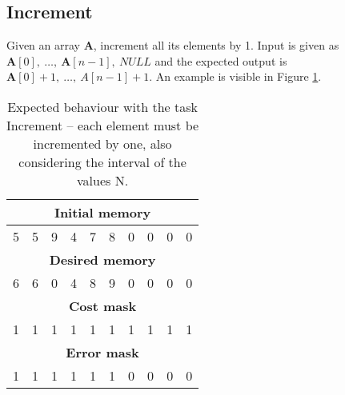 \subsection{Increment}
Given an array $\textbf{A}$, increment all its elements by 1. Input is given as $\textbf{A}[0],\ \dots,\ \textbf{A}[n-1],\ \textit{NULL}$ and the expected output is $\textbf{A}[0] + 1,\ \dots,\ A[n-1] + 1$. An example is visible in Figure \ref{fig:increment-example}.
\begin{table}[h!]
	\centering
	\begin{tabular}{|c|c|c|c|c|c|c|c|c|c|}
		\hline
		\multicolumn{10}{|c|}{\textbf{Initial memory}} \\ \hline
		5 & 5 & 9 & 4 & 7 & 8 & 0 & 0 & 0 & 0 \\ \hline\hline\hline
		\multicolumn{10}{|c|}{\textbf{Desired memory}} \\ \hline
		6 & 6 & 0 & 4 & 8 & 9 & 0 & 0 & 0 & 0 \\ \hline\hline\hline
		\multicolumn{10}{|c|}{\textbf{Cost mask}} \\ \hline
		1 & 1 & 1 & 1 & 1 & 1 & 1 & 1 & 1 & 1 \\ \hline\hline\hline
		\multicolumn{10}{|c|}{\textbf{Error mask}} \\ \hline
		1 & 1 & 1 & 1 & 1 & 1 & 0 & 0 & 0 & 0 \\ \hline
	\end{tabular}
	\caption{Expected behaviour with the task Increment -- each element must be incremented by one, also considering the interval of the values N.}
	\label{fig:increment-example}
\end{table}
\FloatBarrier
